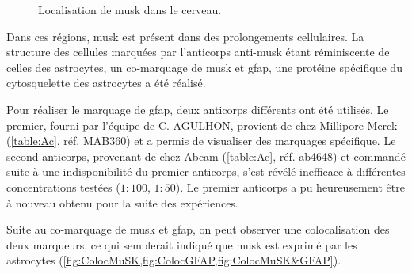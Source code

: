 \begin{figure}[h]
\begin{center}
		\end{center}
		\caption{Localisation de \gls{musk} dans le cerveau.}
		\label{fig:ImmunoMusk}
	\end{figure}
	
	Dans ces régions, \gls{musk} est présent dans des prolongements cellulaires. La structure des cellules marquées par l'anticorps anti-\gls{musk} étant réminiscente de celles des astrocytes, un co-marquage de \gls{musk} et \gls{gfap}, une protéine spécifique du cytosquelette des astrocytes a été réalisé.
	
	Pour réaliser le marquage de \gls{gfap}, deux anticorps différents ont été utilisés. Le premier, fourni par l'équipe de C. AGULHON, provient de chez Millipore-Merck (\cref{table:Ac}, réf. MAB360) et a permis de visualiser des marquages spécifique. Le second anticorps, provenant de chez Abcam (\cref{table:Ac}, réf. ab4648) et commandé suite à une indisponibilité du premier anticorps, s'est révélé inefficace à différentes concentrations testées ($1{:}100$, $1{:}50$). Le premier anticorps a pu heureusement être à nouveau obtenu pour la suite des expériences.
	
	Suite au co-marquage de \gls{musk} et \gls{gfap}, on peut observer une colocalisation des deux marqueurs, ce qui semblerait indiqué que \gls{musk} est exprimé par les astrocytes (\cref{fig:ColocMuSK,fig:ColocGFAP,fig:ColocMuSK&GFAP}).
	
